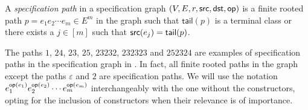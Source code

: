\begin{definition}
A \emph{specification path} in a specification graph $(V,E,r,\textsf{src},\textsf{dst},\textsf{op})$ is a finite rooted path $p=e_1e_2\dotsm e_m \in E^m$ in the graph such that $\textsf{tail}(p)$ is a terminal class or there exists a $j\in[m]$ such that $\textsf{src}(e_j) = \textsf{tail}(p)$.
\end{definition}
The paths $1$, $24$, $23$, $25$, $23232$, $232323$ and $252324$ are examples of specification paths in the specification graph in . In fact, all finite rooted paths in the graph except the paths $\varepsilon$ and $2$ are specification paths. We will use the notation $e_1^{\textsf{op}(e_1)}e_2^{\textsf{op}(e_2)}\dotsm e_m^{\textsf{op}(e_m)}$ interchangeably with the one without the constructors, opting for the inclusion of constructors when their relevance is of importance. 

